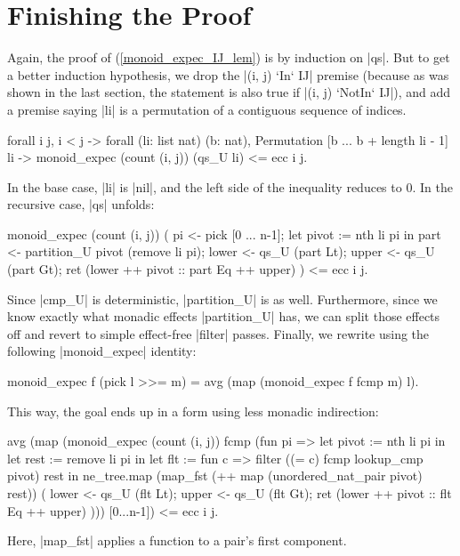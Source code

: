 \documentclass[runningheads]{llncs}
\begin{document}
\section{Finishing the Proof}
\label{finishing}

Again, the proof of (\ref{monoid_expec_IJ_lem}) 
is by induction on |qs|. But to get a better induction hypothesis, we drop the |(i, j) `In` IJ| premise (because as was shown in the last section, the statement is also true if |(i, j) `NotIn` IJ|), and add a premise saying |li| is a permutation of a contiguous sequence of indices.
\begin{code}
  forall i j, i < j -> forall (li: list nat) (b: nat), Permutation [b ... b + length li - 1] li ->
    monoid_expec (count (i, j)) (qs_U li) <= ecc i j.
\end{code}
In the base case, |li| is |nil|, and the left side of the inequality reduces to 0. In the recursive case, |qs| unfolds:
\begin{code}
monoid_expec (count (i, j)) (
    pi <- pick [0 ... n-1];
    let pivot := nth li pi in
    part <- partition_U pivot (remove li pi);
    lower <- qs_U (part Lt);
    upper <- qs_U (part Gt);
    ret (lower ++ pivot :: part Eq ++ upper)
  ) <= ecc i j.
\end{code}
Since |cmp_U| is deterministic, |partition_U| is as well. Furthermore, since
we know exactly what monadic effects |partition_U| has, we can split those
effects off and revert to simple effect-free |filter| passes. Finally, we rewrite using the following |monoid_expec| identity:
\begin{code}
  monoid_expec f (pick l >>= m) = avg (map (monoid_expec f fcmp m) l).
\end{code}
This way, the goal ends up in a form using less monadic indirection:
\begin{code}
avg (map (monoid_expec (count (i, j)) fcmp (fun pi =>
    let pivot := nth li pi in
    let rest := remove li pi in
    let flt := fun c => filter ((= c) fcmp lookup_cmp pivot) rest in
    ne_tree.map (map_fst (++ map (unordered_nat_pair pivot) rest)) (
      lower <- qs_U (flt Lt);
      upper <- qs_U (flt Gt);
      ret (lower ++ pivot :: flt Eq ++ upper)
    ))) [0...n-1]) <= ecc i j.
\end{code}
Here, |map_fst| applies a function to a pair's first component.
\end{document}
